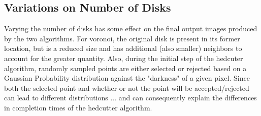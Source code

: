 \documentclass[11pt]{article}
\begin{document}
\subsection{Variations on Number of Disks}
Varying the number of disks has some effect on the final output images produced by the two algorithms. For voronoi, the original disk is present in its former location, but is a reduced size and has additional (also smaller) neighbors to account for the greater quantity. Also, during the initial step of the hedcuter algorithm, randomly sampled points are either selected or rejected based on a Gaussian Probability distribution against the "darkness" of a given pixel. Since both the selected point and whether or not the point will be accepted/rejected can lead to different distributions ... and can consequently explain the differences in completion times of the hedcutter algorithm.
\end{document}
